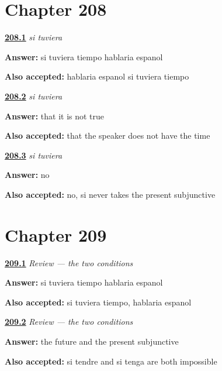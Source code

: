 \section*{Chapter 208}

\noindent\begin{minipage}[t]{\linewidth}
\raggedright
\hyperlink{review-ES-C56-si-tuviera-say}{\textbf{208.1}} \emph{si tuviera}\par
\small \textbf{Answer:} si tuviera tiempo hablaria espanol\par
\footnotesize \textbf{Also accepted:} hablaria espanol si tuviera tiempo
\end{minipage}\par\medskip

\noindent\begin{minipage}[t]{\linewidth}
\raggedright
\hyperlink{review-ES-C56-si-tuviera-implies}{\textbf{208.2}} \emph{si tuviera}\par
\small \textbf{Answer:} that it is not true\par
\footnotesize \textbf{Also accepted:} that the speaker does not have the time
\end{minipage}\par\medskip

\noindent\begin{minipage}[t]{\linewidth}
\raggedright
\hyperlink{review-ES-C56-si-tuviera-trap}{\textbf{208.3}} \emph{si tuviera}\par
\small \textbf{Answer:} no\par
\footnotesize \textbf{Also accepted:} no, si never takes the present subjunctive
\end{minipage}\par\medskip

\section*{Chapter 209}

\noindent\begin{minipage}[t]{\linewidth}
\raggedright
\hyperlink{review-ES-C56-repaso-condiciones-shift}{\textbf{209.1}} \emph{Review — the two conditions}\par
\small \textbf{Answer:} si tuviera tiempo hablaria espanol\par
\footnotesize \textbf{Also accepted:} si tuviera tiempo, hablaria espanol
\end{minipage}\par\medskip

\noindent\begin{minipage}[t]{\linewidth}
\raggedright
\hyperlink{review-ES-C56-repaso-condiciones-bans}{\textbf{209.2}} \emph{Review — the two conditions}\par
\small \textbf{Answer:} the future and the present subjunctive\par
\footnotesize \textbf{Also accepted:} si tendre and si tenga are both impossible
\end{minipage}\par\medskip

